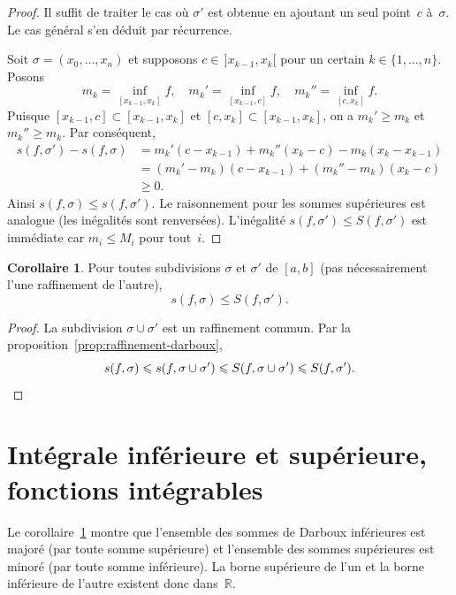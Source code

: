 \documentclass[12pt,a4paper,openany]{book}
\theoremstyle{definition}
\newtheorem{corollaire}{Corollaire}[chapter]
\newcommand{\R}{\mathbb{R}}
\begin{document}
\begin{proof}
  Il suffit de traiter le cas où $\sigma'$ est obtenue en ajoutant un seul point~$c$ à~$\sigma$. Le cas général s'en déduit par récurrence.

  Soit $\sigma = (x_0, \ldots, x_n)$ et supposons $c \in \,]x_{k-1}, x_k[$ pour un certain $k \in \{1, \ldots, n\}$. Posons
  \[
    m_k = \inf_{[x_{k-1}, x_k]} f, \quad
    m_k' = \inf_{[x_{k-1}, c]} f, \quad
    m_k'' = \inf_{[c, x_k]} f.
  \]
  Puisque $[x_{k-1}, c] \subset [x_{k-1}, x_k]$ et $[c, x_k] \subset [x_{k-1}, x_k]$, on a $m_k' \geqslant m_k$ et $m_k'' \geqslant m_k$. Par conséquent,
  \begin{align*}
    s(f, \sigma') - s(f, \sigma)
    &= m_k'(c - x_{k-1}) + m_k''(x_k - c) - m_k(x_k - x_{k-1}) \\
    &= (m_k' - m_k)(c - x_{k-1}) + (m_k'' - m_k)(x_k - c) \\
    &\geqslant 0.
  \end{align*}
  Ainsi $s(f, \sigma) \leqslant s(f, \sigma')$. Le raisonnement pour les sommes supérieures est analogue (les inégalités sont renversées). L'inégalité $s(f, \sigma') \leqslant S(f, \sigma')$ est immédiate car $m_i \leqslant M_i$ pour tout~$i$.
\end{proof}

\begin{corollaire}\label{cor:inf-leq-sup}
  Pour toutes subdivisions $\sigma$ et $\sigma'$ de $[a,b]$ (pas nécessairement l'une raffinement de l'autre),
  \[
    s(f, \sigma) \leqslant S(f, \sigma').
  \]
\end{corollaire}

\begin{proof}
  La subdivision $\sigma \cup \sigma'$ est un raffinement commun. Par la proposition~\ref{prop:raffinement-darboux},
  \[
    s(f, \sigma) \leqslant s(f, \sigma \cup \sigma') \leqslant S(f, \sigma \cup \sigma') \leqslant S(f, \sigma'). \qedhere
  \]
\end{proof}

\section{Intégrale inférieure et supérieure, fonctions intégrables}
\label{sec:integrale-inf-sup}

Le corollaire~\ref{cor:inf-leq-sup} montre que l'ensemble des sommes de Darboux inférieures est majoré (par toute somme supérieure) et l'ensemble des sommes supérieures est minoré (par toute somme inférieure). La borne supérieure de l'un et la borne inférieure de l'autre existent donc dans~$\R$.
\end{document}
